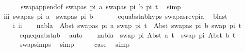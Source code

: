 \begin{isabellebody}
\ \ \ \ \ \ swap{\isacharunderscore}{\kern0pt}append{\isacharbrackleft}{\kern0pt}of\ {\isacartoucheopen}{\isacharbrackleft}{\kern0pt}{\isacharparenleft}{\kern0pt}swapas\ pi\ a{\isacharcomma}{\kern0pt}\ swapas\ pi\ b{\isacharparenright}{\kern0pt}{\isacharbrackright}{\kern0pt}{\isacartoucheclose}\ pi\ t{}{\isacharprime}{\kern0pt}{\isacharbrackright}{\kern0pt}\ \isamarkupfalse%
\ simp\isanewline
\isanewline
\ \ \isamarkupfalse%
\ iii{\isacharcolon}{\kern0pt}\ {\isachardoublequoteopen}swapas\ pi\ a\ {\isasymnoteq}\ swapas\ pi\ b{\isachardoublequoteclose}\ \isanewline
\ \ \ \ \isamarkupfalse%
\ equ{\isacharunderscore}{\kern0pt}abst{\isacharunderscore}{\kern0pt}ab{\isachardot}{\kern0pt}hyps{\isacharparenleft}{\kern0pt}{}{\isacharparenright}{\kern0pt}\ swapas{\isacharunderscore}{\kern0pt}rev{\isacharunderscore}{\kern0pt}pi{\isacharunderscore}{\kern0pt}a\ \isamarkupfalse%
\ blast\isanewline
\ \ \isanewline
\ \ \isamarkupfalse%
\ i\ ii\isanewline
\ \ \isamarkupfalse%
\ {\isachardoublequoteopen}nabla\ {\isasymturnstile}\ Abst\ {\isacharparenleft}{\kern0pt}swapas\ pi\ a{\isacharparenright}{\kern0pt}\ {\isacharparenleft}{\kern0pt}swap\ pi\ t{}{\isacharprime}{\kern0pt}{\isacharparenright}{\kern0pt}\ {\isasymapprox}\ Abst\ {\isacharparenleft}{\kern0pt}swapas\ pi\ b{\isacharparenright}{\kern0pt}\ {\isacharparenleft}{\kern0pt}swap\ pi\ t{}{\isacharprime}{\kern0pt}{\isacharparenright}{\kern0pt}{\isachardoublequoteclose}\isanewline
\ \ \ \ \isamarkupfalse%
\ equ{\isachardot}{\kern0pt}equ{\isacharunderscore}{\kern0pt}abst{\isacharunderscore}{\kern0pt}ab\ \isamarkupfalse%
\ auto\isanewline
\ \ \isamarkupfalse%
\ {\isachardoublequoteopen}nabla\ {\isasymturnstile}\ swap\ pi\ {\isacharparenleft}{\kern0pt}Abst\ a\ t{}{\isacharprime}{\kern0pt}{\isacharparenright}{\kern0pt}\ {\isasymapprox}\ swap\ pi\ {\isacharparenleft}{\kern0pt}Abst\ b\ t{}{\isacharprime}{\kern0pt}{\isacharparenright}{\kern0pt}{\isachardoublequoteclose}\isanewline
\ \ \ \ \isamarkupfalse%
\ swap{\isachardot}{\kern0pt}simps{\isacharparenleft}{\kern0pt}{}{\isacharparenright}{\kern0pt}\ \isamarkupfalse%
\ simp\isanewline
\ \ \isamarkupfalse%
\ \isamarkupfalse%
\ {\isacharquery}{\kern0pt}case\ \isamarkupfalse%
\ simp\isanewline
{}\isamarkupfalse%

\end{isabellebody}

